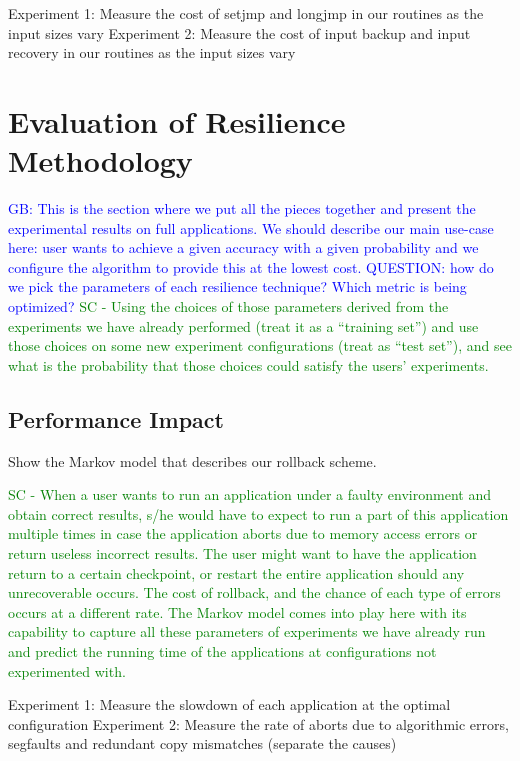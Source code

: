 \documentclass{sig-alternate}
\newcommand{\sui}[1]{%
  \textcolor{green}{SC - #1}
}
\newcommand{\greg}[1]{%
  \textcolor{blue}{GB: #1}
}
\begin{document}
Experiment 1: Measure the cost of setjmp and longjmp in our routines as the input sizes vary
Experiment 2: Measure the cost of input backup and input recovery in our routines as the input sizes vary

\section{Evaluation of Resilience Methodology}
\label{sec:eval}

\greg{This is the section where we put all the pieces together and present the experimental results on full applications. We should describe our main use-case here: user wants to achieve a given accuracy with a given probability and we configure the algorithm to provide this at the lowest cost. QUESTION: how do we pick the parameters of each resilience technique? Which metric is being optimized?} \sui{Using the choices of those parameters derived from the experiments we have already performed (treat it as a ``training set'') and use those choices on some new experiment configurations (treat as ``test set''), and see what is the probability that those choices could satisfy the users' experiments.}

\subsection{Performance Impact}
\label{sec:eval:perf}

Show the Markov model that describes our rollback scheme.

\sui{When a user wants to run an application under a faulty environment and obtain correct results, s/he would have to expect to run a part of this application multiple times in case the application aborts due to memory access errors or return useless incorrect results. The user might want to have the application return to a certain checkpoint, or restart the entire application should any unrecoverable occurs. The cost of rollback, and the chance of each type of errors occurs at a different rate. The Markov model comes into play here with its capability to capture all these parameters of experiments we have already run and predict the running time of the applications at configurations not experimented with.}


Experiment 1: Measure the slowdown of each application at the optimal configuration
Experiment 2: Measure the rate of aborts due to algorithmic errors, segfaults and redundant copy mismatches (separate the causes)
\end{document}
